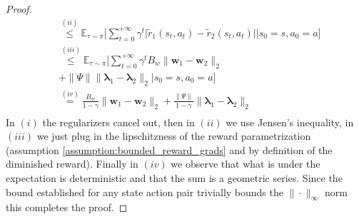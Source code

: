 \begin{lemma}
\begin{proof}
\begin{align*}
            &\stackrel{(ii)}{\leq}
            \mathbb{E}_{\tau \sim \pi}\Bigg[ 
                \sum_{t=0}^{+\infty} \gamma^t 
                \big|
                \tilde{r}_1(s_t,a_t)-\tilde{r}_2(s_t,a_t)
                \big|
                \Bigg| s_0 =s, a_0 = a
            \Bigg]
            \\
            &\stackrel{(iii)}{\leq}
            \mathbb{E}_{\tau \sim \pi}\Bigg[ 
                \sum_{t=0}^{+\infty} \gamma^t 
                B_w \|\bm{w}_1-\bm{w}_2\|_2 \\ &
                + \|\Psi\| \|\bm{\lambda}_1-\bm{\lambda}_2\|_2 
                \Bigg| s_0 =s, a_0 = a
            \Bigg]
            \\
            &\stackrel{(iv)}{=}
                \frac{B_w}{1-\gamma} \|\bm{w}_1-\bm{w}_2\|_2 
                + \frac{\|\Psi\|}{1-\gamma} \|\bm{\lambda}_1-\bm{\lambda}_2\|_2 
            \\
        \end{align*}
        In $(i)$ the regularizers cancel out, then in $(ii)$ we use Jensen's inequality, in $(iii)$ we just plug in the lipschitzness of the reward parametrization (assumption \ref{assumption:bounded_reward_grads} and by definition of the diminished reward). Finally  in $(iv)$ we observe that what is under the expectation is deterministic and that the sum is a geometric series. Since the bound established for any state action pair trivially bounds the $\|\cdot\|_\infty$ norm this completes the proof.
    \end{proof}
\end{lemma}

